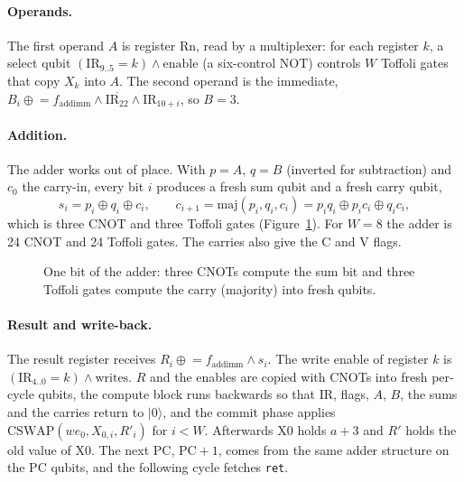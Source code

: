 \documentclass[11pt]{article}
\begin{document}
\paragraph{Operands.} The first operand $A$ is register Rn, read by a multiplexer: for each
register $k$, a select qubit $(\mathrm{IR}_{9..5} = k) \wedge \mathrm{enable}$ (a six-control NOT)
controls $W$ Toffoli gates that copy $X_k$ into $A$. The second operand is the immediate,
$B_i \mathrel{\oplus}= f_{\mathrm{addimm}} \wedge \overline{\mathrm{IR}_{22}} \wedge \mathrm{IR}_{10+i}$, so
$B = 3$.

\paragraph{Addition.} The adder works out of place. With $p = A$, $q = B$ (inverted for
subtraction) and $c_0$ the carry-in, every bit $i$ produces a fresh sum qubit and a fresh
carry qubit,
\[
  s_i = p_i \oplus q_i \oplus c_i, \qquad
  c_{i+1} = \mathrm{maj}(p_i, q_i, c_i) = p_i q_i \oplus p_i c_i \oplus q_i c_i ,
\]
which is three CNOT and three Toffoli gates (Figure~\ref{fig:slice}). For $W = 8$ the adder is
24 CNOT and 24 Toffoli gates. The carries also give the C and V flags.

\begin{figure}[H]
\centering
{}
\caption{One bit of the adder: three CNOTs compute the sum bit and three Toffoli gates
compute the carry (majority) into fresh qubits.}
\label{fig:slice}
\end{figure}

\paragraph{Result and write-back.} The result register receives $R_i \mathrel{\oplus}=
f_{\mathrm{addimm}} \wedge s_i$. The write enable of register $k$ is
$(\mathrm{IR}_{4..0} = k) \wedge \mathrm{writes}$. $R$ and the enables are copied with CNOTs into
fresh per-cycle qubits, the compute block runs backwards so that IR, flags, $A$, $B$, the
sums and the carries return to $|0\rangle$, and the commit phase applies
$\mathrm{CSWAP}(\mathit{we}_0, X_{0,i}, R'_i)$ for $i < W$. Afterwards X0 holds $a + 3$ and
$R'$ holds the old value of X0. The next PC, $\mathrm{PC} + 1$, comes from the same adder
structure on the PC qubits, and the following cycle fetches \texttt{ret}.
\end{document}
